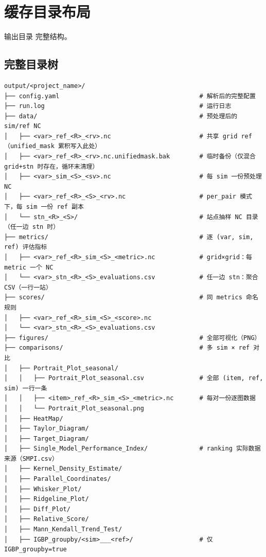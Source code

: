 
\chapter{缓存目录布局}

\openbench{} 输出目录  完整结构。

\section{完整目录树}

\begin{verbatim}
output/<project_name>/
├── config.yaml                                      # 解析后的完整配置
├── run.log                                          # 运行日志
├── data/                                            # 预处理后的 sim/ref NC
│   ├── <var>_ref_<R>_<rv>.nc                        # 共享 grid ref（unified_mask 累积写入此处）
│   ├── <var>_ref_<R>_<rv>.nc.unifiedmask.bak        # 临时备份（仅混合 grid+stn 时存在，循环末清理）
│   ├── <var>_sim_<S>_<sv>.nc                        # 每 sim 一份预处理 NC
│   ├── <var>_ref_<R>_<S>_<rv>.nc                    # per_pair 模式下，每 sim 一份 ref 副本
│   └── stn_<R>_<S>/                                 # 站点抽样 NC 目录（任一边 stn 时）
├── metrics/                                         # 逐 (var, sim, ref) 评估指标
│   ├── <var>_ref_<R>_sim_<S>_<metric>.nc            # grid×grid：每 metric 一个 NC
│   └── <var>_stn_<R>_<S>_evaluations.csv            # 任一边 stn：聚合 CSV（一行一站）
├── scores/                                          # 同 metrics 命名规则
│   ├── <var>_ref_<R>_sim_<S>_<score>.nc
│   └── <var>_stn_<R>_<S>_evaluations.csv
├── figures/                                         # 全部可视化（PNG）
├── comparisons/                                     # 多 sim × ref 对比
│   ├── Portrait_Plot_seasonal/
│   │   ├── Portrait_Plot_seasonal.csv               # 全部 (item, ref, sim) 一行一条
│   │   ├── <item>_ref_<R>_sim_<S>_<metric>.nc       # 每对一份逐图数据
│   │   └── Portrait_Plot_seasonal.png
│   ├── HeatMap/
│   ├── Taylor_Diagram/
│   ├── Target_Diagram/
│   ├── Single_Model_Performance_Index/              # ranking 实际数据来源（SMPI.csv）
│   ├── Kernel_Density_Estimate/
│   ├── Parallel_Coordinates/
│   ├── Whisker_Plot/
│   ├── Ridgeline_Plot/
│   ├── Diff_Plot/
│   ├── Relative_Score/
│   ├── Mann_Kendall_Trend_Test/
│   ├── IGBP_groupby/<sim>___<ref>/                  # 仅 IGBP_groupby=true

\end{verbatim}
